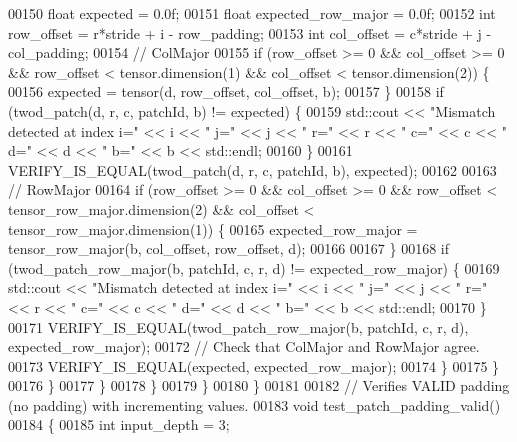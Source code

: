 \begin{DoxyCode}
00150               \textcolor{keywordtype}{float} expected = 0.0f;
00151               \textcolor{keywordtype}{float} expected\_row\_major = 0.0f;
00152               \textcolor{keywordtype}{int} row\_offset = r*stride + i - row\_padding;
00153               \textcolor{keywordtype}{int} col\_offset = c*stride + j - col\_padding;
00154               \textcolor{comment}{// ColMajor}
00155               \textcolor{keywordflow}{if} (row\_offset >= 0 && col\_offset >= 0 && row\_offset < tensor.dimension(1) && col\_offset < 
      tensor.dimension(2)) \{
00156                 expected = tensor(d, row\_offset, col\_offset, b);
00157               \}
00158               \textcolor{keywordflow}{if} (twod\_patch(d, r, c, patchId, b) != expected) \{
00159                 std::cout << \textcolor{stringliteral}{"Mismatch detected at index i="} << i << \textcolor{stringliteral}{" j="} << j << \textcolor{stringliteral}{" r="} << r << \textcolor{stringliteral}{" c="} << c
       << \textcolor{stringliteral}{" d="} << d << \textcolor{stringliteral}{" b="} << b << std::endl;
00160               \}
00161               VERIFY\_IS\_EQUAL(twod\_patch(d, r, c, patchId, b), expected);
00162 
00163               \textcolor{comment}{// RowMajor}
00164               \textcolor{keywordflow}{if} (row\_offset >= 0 && col\_offset >= 0 && row\_offset < tensor\_row\_major.dimension(2) && 
      col\_offset < tensor\_row\_major.dimension(1)) \{
00165                 expected\_row\_major = tensor\_row\_major(b, col\_offset, row\_offset, d);
00166 
00167               \}
00168               \textcolor{keywordflow}{if} (twod\_patch\_row\_major(b, patchId, c, r, d) != expected\_row\_major) \{
00169                 std::cout << \textcolor{stringliteral}{"Mismatch detected at index i="} << i << \textcolor{stringliteral}{" j="} << j << \textcolor{stringliteral}{" r="} << r << \textcolor{stringliteral}{" c="} << c
       << \textcolor{stringliteral}{" d="} << d << \textcolor{stringliteral}{" b="} << b << std::endl;
00170               \}
00171               VERIFY\_IS\_EQUAL(twod\_patch\_row\_major(b, patchId, c, r, d), expected\_row\_major);
00172               \textcolor{comment}{// Check that ColMajor and RowMajor agree.}
00173               VERIFY\_IS\_EQUAL(expected, expected\_row\_major);
00174             \}
00175           \}
00176         \}
00177       \}
00178     \}
00179   \}
00180 \}
00181 
00182 \textcolor{comment}{// Verifies VALID padding (no padding) with incrementing values.}
00183 \textcolor{keywordtype}{void} test\_patch\_padding\_valid()
00184 \{
00185   \textcolor{keywordtype}{int} input\_depth = 3;

\end{DoxyCode}
